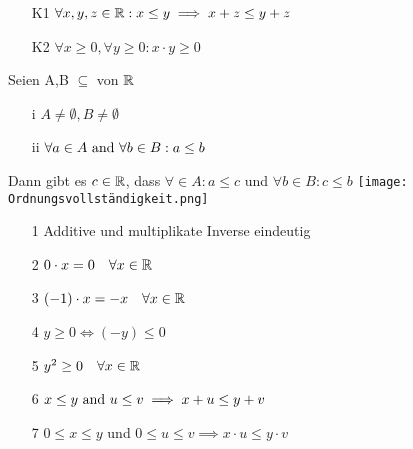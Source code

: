 \Def[Kompatibilität]
\begin{enumerate}
    \item[K1] \(\forall x,y,z \in \mathbb{R}: x \leq y \implies x + z \leq y + z \)
    \item[K2] \(\forall x \geq 0, \forall y \geq 0: x \cdot y \geq 0\)
\end{enumerate}
\Def[Ordnungsvollständigkeit] \newline 
Seien A,B \(\subseteq\) von \(\mathbb{R}\)
\begin{enumerate}
    \item [i] \(A \neq \emptyset, B \neq \emptyset\)
    \item [ii] \(\forall a \in A$ and $\forall b \in B: a \leq b\)
\end{enumerate}
Dann gibt es \(c \in \mathbb{R}\), dass \(\forall \in A : a \leq c\) und \(\forall b \in B: c \leq b\) \newline
\texttt{[image: Ordnungsvollständigkeit.png]}
\Korollar[1.6]
\begin{enumerate}
    \item [1] Additive und multiplikate Inverse eindeutig
    \item [2] \(0 \cdot x = 0 \quad \forall x \in \mathbb{R} \)
    \item [3] \((-1) \cdot x = -x \quad \forall x \in \mathbb{R} \)
    \item [4] \(y \geq 0 \Leftrightarrow (-y) \leq 0\)
    \item [5] \(y^2 \geq 0 \quad \forall x \in \mathbb{R} \)
    \item [6] \(x \leq y $ and $u \leq v \implies x+ u \leq y + v\)
    \item [7] \(0 \leq x \leq y\) und \(0 \leq u \leq v \implies x \cdot u \leq y \cdot v\)
    \newline \newline
\end{enumerate}

